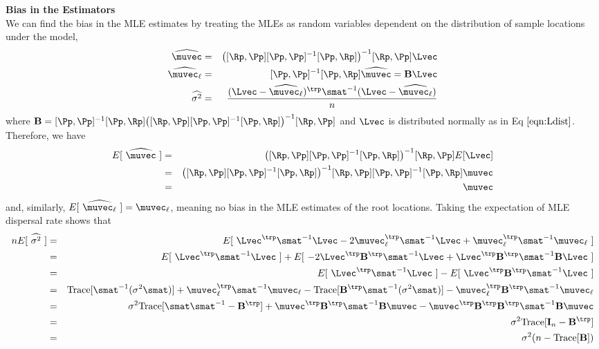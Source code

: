 \textbf{Bias in the Estimators}\\
We can find the bias in the MLE estimates by treating the MLEs as random variables dependent on the distribution of sample locations under the model, 
\begin{eqnarray}
    \widehat{\muvec} &=& \big( [\Rp,\Pp] [\Pp, \Pp]^{-1}[\Pp,\Rp] \big)^{-1} [\Rp,\Pp]\Lvec \\
    \widehat{\muvec_\ell} &=& [\Pp,\Pp]^{-1}[\Pp,\Rp]\widehat{\muvec} = \mathbf{B} \Lvec \\
    \widehat{\sigma^2} &=& \displaystyle \frac{(\Lvec - \widehat{\muvec_\ell})^\trp \smat^{-1}(\Lvec-\widehat{\muvec_\ell})}{n}
\end{eqnarray}
where $\mathbf{B} = [\Pp,\Pp]^{-1}[\Pp,\Rp]\big( [\Rp,\Pp] [\Pp, \Pp]^{-1}[\Pp,\Rp] \big)^{-1} [\Rp,\Pp] $ and $\Lvec$ is distributed normally as in Eq $\ref{eqn:Ldist}$. Therefore, we have 
\begin{eqnarray}
    E[\ \widehat{\muvec}\ ] &=& \big( [\Rp,\Pp] [\Pp, \Pp]^{-1}[\Pp,\Rp] \big)^{-1} [\Rp,\Pp]E[\Lvec] \\
    &=& \big( [\Rp,\Pp] [\Pp, \Pp]^{-1}[\Pp,\Rp] \big)^{-1} [\Rp,\Pp][\Pp,\Pp]^{-1}[\Pp,\Rp]\muvec\\
    &=& \muvec    
\end{eqnarray}
and, similarly, $E[\ \widehat{\muvec_\ell}\ ] = \muvec_\ell$, meaning no bias in the MLE estimates of the root locations.
Taking the expectation of MLE dispersal rate shows that
\begin{eqnarray}
    nE[\ \widehat{\sigma^2} \ ] &=& E[ \ \Lvec^\trp\smat^{-1}\Lvec -2\muvec_\ell^\trp \smat^{-1}\Lvec + \muvec_\ell^\trp \smat^{-1} \muvec_\ell \ ] \\
    &=& E[ \ \Lvec^\trp\smat^{-1}\Lvec \ ] + E[ \ -2\Lvec^\trp \mathbf{B}^\trp\smat^{-1}\Lvec + \Lvec^\trp \mathbf{B}^\trp \smat^{-1} \mathbf{B}\Lvec \ ] \\
    &=& E[ \ \Lvec^\trp\smat^{-1}\Lvec \ ] - E[ \ \Lvec^\trp \mathbf{B}^\trp\smat^{-1}\Lvec \ ] \\
    &=& \text{Trace}[ \smat^{-1} (\sigma^2 \smat) ] + \muvec_\ell^\trp \smat^{-1}\muvec_\ell -  \text{Trace}[  \mathbf{B}^\trp \smat^{-1} (\sigma^2 \smat) ]  - \muvec_\ell^\trp \mathbf{B}^\trp \smat^{-1}\muvec_\ell \\
    &=& \sigma^2 \text{Trace}[ \smat \smat^{-1} - \mathbf{B}^\trp ] + \muvec^\trp \mathbf{B}^\trp \smat^{-1} \mathbf{B} \muvec - \muvec^\trp \mathbf{B}^\trp \mathbf{B}^\trp \smat^{-1} \mathbf{B} \muvec \\
    &=& \sigma^2\text{Trace}[\mathbf{I}_n - \mathbf{B}^\trp] \\
    &=& \sigma^2(n - \text{Trace}[\mathbf{B}])
\end{eqnarray}
